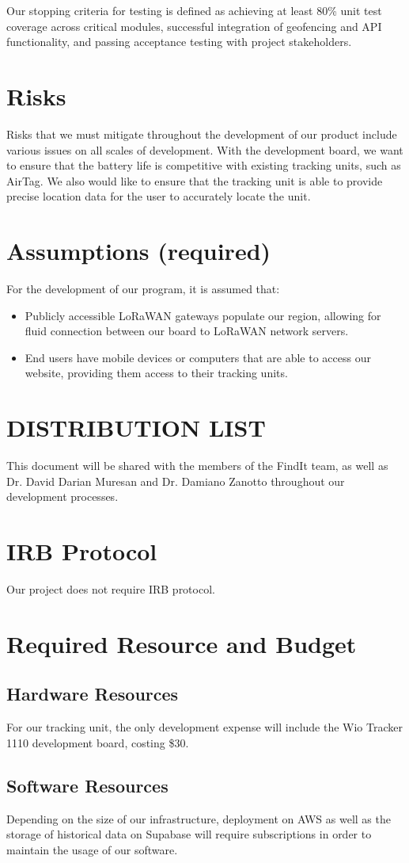 \noindent
Our stopping criteria for testing is defined as achieving at least 80\% unit test coverage across critical modules, successful integration of geofencing and API functionality, and passing acceptance testing with project stakeholders.


\section{Risks}
Risks that we must mitigate throughout the development of our product include various issues on all scales of development. With the development board, we want to ensure that the battery life is competitive with existing tracking units, such as AirTag. We also would like to ensure that the tracking unit is able to provide precise location data for the user to accurately locate the unit.

\section{Assumptions (required)}
For the development of our program, it is assumed that:
\begin{itemize}
    \item Publicly accessible LoRaWAN gateways populate our region, allowing for fluid connection between our board to LoRaWAN network servers.
    \item End users have mobile devices or computers that are able to access our website, providing them access to their tracking units.
\end{itemize}

\section{DISTRIBUTION LIST}
 This document will be shared with the members of the FindIt team, as well as Dr. David Darian Muresan and Dr. Damiano Zanotto throughout our development processes.

\section{IRB Protocol}
Our project does not require IRB protocol.


\section{Required Resource and Budget}

\subsection{Hardware Resources}
For our tracking unit, the only development expense will include the Wio Tracker 1110 development board, costing \$30.
\subsection{Software Resources}
Depending on the size of our infrastructure, deployment on AWS as well as the storage of historical data on Supabase will require subscriptions in order to maintain the usage of our software.


